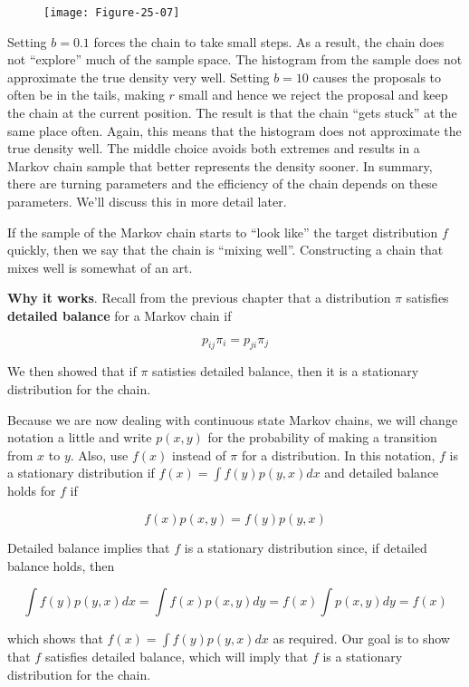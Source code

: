 \begin{figure}[H]
\centering
\texttt{[image: Figure-25-07]}
\end{figure}

Setting \(b = 0.1\) forces the chain to take small steps. As a result,
the chain does not ``explore'' much of the sample space. The histogram
from the sample does not approximate the true density very well. Setting
\(b = 10\) causes the proposals to often be in the tails, making \(r\)
small and hence we reject the proposal and keep the chain at the current
position. The result is that the chain ``gets stuck'' at the same place
often. Again, this means that the histogram does not approximate the
true density well. The middle choice avoids both extremes and results in
a Markov chain sample that better represents the density sooner. In
summary, there are turning parameters and the efficiency of the chain
depends on these parameters. We'll discuss this in more detail later.

If the sample of the Markov chain starts to ``look like'' the target
distribution \(f\) quickly, then we say that the chain is ``mixing
well''. Constructing a chain that mixes well is somewhat of an art.

\textbf{Why it works}. Recall from the previous chapter that a
distribution \(\pi\) satisfies \textbf{detailed balance} for a Markov
chain if

\[ p_{ij} \pi_{i} = p_{ji} \pi_{j} \]

We then showed that if \(\pi\) satisties detailed balance, then it is a
stationary distribution for the chain.

Because we are now dealing with continuous state Markov chains, we will
change notation a little and write \(p(x, y)\) for the probability of
making a transition from \(x\) to \(y\). Also,  use \(f(x)\)
instead of \(\pi\) for a distribution. In this notation, \(f\) is a
stationary distribution if \(f(x) = \int f(y) p(y, x) dx\) and detailed
balance holds for \(f\) if

\[ f(x) p(x, y) = f(y) p(y, x) \]

Detailed balance implies that \(f\) is a stationary distribution since,
if detailed balance holds, then

\[ \int f(y) p(y, x) dx = \int f(x) p(x, y) dy = f(x) \int p(x, y) dy = f(x) \]

which shows that \(f(x) = \int f(y) p(y, x) dx\) as required. Our goal
is to show that \(f\) satisfies detailed balance, which will imply that
\(f\) is a stationary distribution for the chain.

